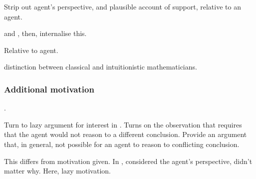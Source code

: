 \begin{note}
  \color{red}
  Strip out agent's perspective, and plausible account of support, relative to an agent.

  \zS{} and \qzS{}, then, internalise this.

  Relative to agent.

  distinction between classical and intuitionistic mathematicians.
\end{note}

\subsubsection{Additional motivation}

\begin{note}
  \zSX{}.

  Turn to lazy argument for interest in \zSX{}.
  Turns on the observation that \zSX{} requires that the agent would not reason to a different conclusion.
  Provide an argument that, in general, not possible for an agent to reason to conflicting conclusion.

  This differs from motivation given.
  In , considered the agent's perspective, didn't matter why.
  Here, lazy motivation.
\end{note}


